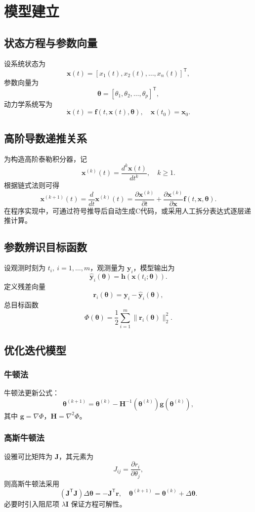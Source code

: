 \chapter{模型建立}

\section{状态方程与参数向量}
设系统状态为
\[
\mathbf{x}(t)=\left[x_1(t),x_2(t),\ldots,x_n(t)\right]^\mathsf{T},
\]
参数向量为
\[
\boldsymbol{\theta}=\left[\theta_1,\theta_2,\ldots,\theta_p\right]^\mathsf{T},
\]
动力学系统写为
\[
\dot{\mathbf{x}}(t)=\mathbf{f}\!\left(t,\mathbf{x}(t),\boldsymbol{\theta}\right),\quad \mathbf{x}(t_0)=\mathbf{x}_0.
\]

\section{高阶导数递推关系}
为构造高阶泰勒积分器，记
\[
\mathbf{x}^{(k)}(t)=\frac{d^k\mathbf{x}(t)}{dt^k},\quad k\ge 1.
\]
根据链式法则可得
\[
\mathbf{x}^{(k+1)}(t)=\frac{d}{dt}\mathbf{x}^{(k)}(t)=
\frac{\partial \mathbf{x}^{(k)}}{\partial t}+
\frac{\partial \mathbf{x}^{(k)}}{\partial \mathbf{x}}\mathbf{f}(t,\mathbf{x},\boldsymbol{\theta}).
\]
在程序实现中，可通过符号推导后自动生成C代码，或采用人工拆分表达式逐层递推计算。

\section{参数辨识目标函数}
设观测时刻为 $t_i,\ i=1,\ldots,m$，观测量为 $\mathbf{y}_i$，模型输出为
\[
\hat{\mathbf{y}}_i(\boldsymbol{\theta})=\mathbf{h}(\mathbf{x}(t_i;\boldsymbol{\theta})).
\]
定义残差向量
\[
\mathbf{r}_i(\boldsymbol{\theta})=\mathbf{y}_i-\hat{\mathbf{y}}_i(\boldsymbol{\theta}),
\]
总目标函数
\[
\Phi(\boldsymbol{\theta})=\frac{1}{2}\sum_{i=1}^m \|\mathbf{r}_i(\boldsymbol{\theta})\|_2^2.
\]

\section{优化迭代模型}
\subsection{牛顿法}
牛顿法更新公式：
\[
\boldsymbol{\theta}^{(k+1)}=\boldsymbol{\theta}^{(k)}-\mathbf{H}^{-1}(\boldsymbol{\theta}^{(k)})\mathbf{g}(\boldsymbol{\theta}^{(k)}),
\]
其中 $\mathbf{g}=\nabla\Phi$，$\mathbf{H}=\nabla^2\Phi$。

\subsection{高斯牛顿法}
设雅可比矩阵为 $\mathbf{J}$，其元素为
\[
J_{ij}=\frac{\partial r_i}{\partial \theta_j},
\]
则高斯牛顿法采用
\[
\left(\mathbf{J}^\mathsf{T}\mathbf{J}\right)\Delta\boldsymbol{\theta}
=-\mathbf{J}^\mathsf{T}\mathbf{r},\quad
\boldsymbol{\theta}^{(k+1)}=\boldsymbol{\theta}^{(k)}+\Delta\boldsymbol{\theta}.
\]
必要时引入阻尼项 $\lambda\mathbf{I}$ 保证方程可解性。
